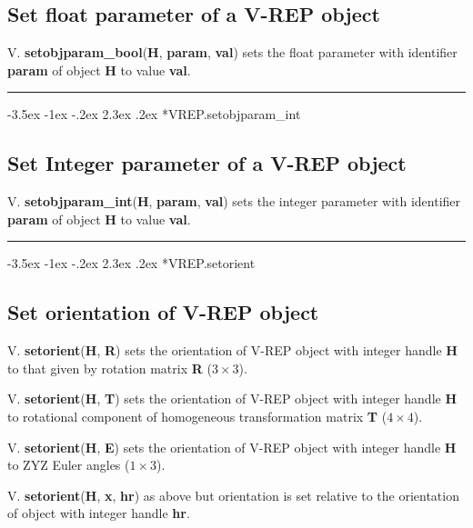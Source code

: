 \documentclass[a4paper]{article}
\makeatletter
\renewcommand\section{%
\@startsection{section}{1}{\z@}%
  {-3.5ex \@plus -1ex \@minus -.2ex}%
  {2.3ex \@plus.2ex}%
  {\color{red}\sffamily\huge\bfseries}}
\makeatother
\begin{document}
\subsection*{Set float parameter of a V-REP object}
V.\textbf{\color{red} setobjparam\_bool}(\textbf{H}, \textbf{param}, \textbf{val}) sets the float parameter
with identifier \textbf{param} of object \textbf{H} to value \textbf{val}.

\vspace{1.5ex}\hrule

\hypertarget{VREP.setobjparam\_int}{\section*{VREP.setobjparam\_int}}
\subsection*{Set Integer parameter of a V-REP object}
V.\textbf{\color{red} setobjparam\_int}(\textbf{H}, \textbf{param}, \textbf{val}) sets the integer parameter
with identifier \textbf{param} of object \textbf{H} to value \textbf{val}.

\vspace{1.5ex}\hrule

\hypertarget{VREP.setorient}{\section*{VREP.setorient}}
\subsection*{Set orientation of V-REP object}
V.\textbf{\color{red} setorient}(\textbf{H}, \textbf{R}) sets the orientation of V-REP object with integer
handle \textbf{H} to that given by rotation matrix \textbf{R} ($3 \times 3$).

V.\textbf{\color{red} setorient}(\textbf{H}, \textbf{T}) sets the orientation of V-REP object with integer
handle \textbf{H} to rotational component of homogeneous transformation matrix
\textbf{T} ($4 \times 4$).

V.\textbf{\color{red} setorient}(\textbf{H}, \textbf{E}) sets the orientation of V-REP object with integer
handle \textbf{H} to ZYZ Euler angles ($1 \times 3$).

V.\textbf{\color{red} setorient}(\textbf{H}, \textbf{x}, \textbf{hr}) as above but orientation is set relative to the
orientation of object with integer handle \textbf{hr}.
\end{document}
